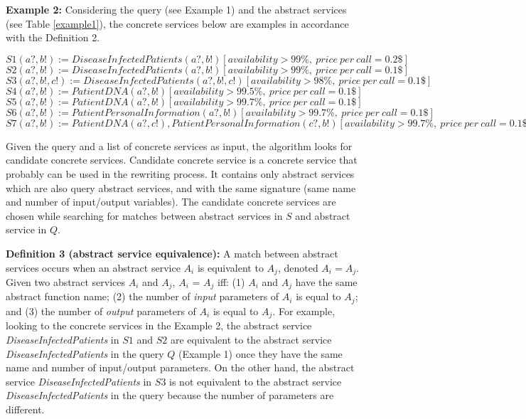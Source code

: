 \noindent \textbf{Example 2:} Considering the query (see Example 1) and the abstract services (see Table \ref{example1}), the concrete services below are examples in accordance with the Definition 2.

\begin{flushleft}
$S1 (a?, b!) := DiseaseInfectedPatients(a?, b!)[availability > 99\%, \ price \ per \ call = 0.2\$]$ \\
$S2 (a?, b!) := DiseaseInfectedPatients(a?, b!)[availability > 99\%, \ price \ per \ call = 0.1\$]$ \\
$S3 (a?, b!, c!) := DiseaseInfectedPatients(a?, b!, c!)[availability > 98\%, \ price \ per \ call = 0.1\$]$ \\
$S4 (a?, b!) := PatientDNA(a?, b!)[availability > 99.5\%, \ price \ per \ call = 0.1\$]$ \\
$S5 (a?, b!) := PatientDNA(a?, b!)[availability > 99.7\%, \ price \ per \ call = 0.1\$]$ \\
$S6 (a?, b!) := PatientPersonalInformation(a?, b!)[availability > 99.7\%, \ price \ per \ call = 0.1\$]$ \\
$S7 (a?, b!) := PatientDNA(a?, c!),PatientPersonalInformation(c?, b!)[availability > 99.7\%, \ price \ per \ call = 0.1\$]$ \\
\end{flushleft}

Given the query and a list of concrete services as input, the algorithm looks for candidate concrete services. 
Candidate concrete service is a concrete service that probably can be used in the rewriting process. 
It contains only abstract services which are also query abstract services, and with the same signature (same name and number of input/output variables).
The candidate concrete services are chosen while searching for matches between abstract services in $S$ and abstract service in $Q$. 

\noindent \textbf{Definition 3 (abstract service equivalence):} 
A match between abstract services occurs when an abstract service $A_{i}$ is equivalent to $A_{j}$, denoted $A_{i} = A_{j}$. 
Given two abstract services $A_{i}$ and $A_{j}$, $A_{i}$ = $A_{j}$ iff: (1) $A_{i}$ and $A_{j}$ have the same abstract function name; (2) the number of \textit{input} parameters of $A_{i}$ is equal to $A_{j}$; and (3) the number of \textit{output} parameters of $A_{i}$ is equal to $A_{j}$. 
For example, looking to the concrete services in the Example 2, the abstract service \textit{DiseaseInfectedPatients} in $S1$ and $S2$ are equivalent to the abstract service \textit{DiseaseInfectedPatients} in the query $Q$ (Example 1) once they have the same name and number of input/output parameters.
On the other hand, the abstract service \textit{DiseaseInfectedPatients} in $S3$ is not equivalent to the abstract service \textit{DiseaseInfectedPatients} in the query because the number of parameters are different.

